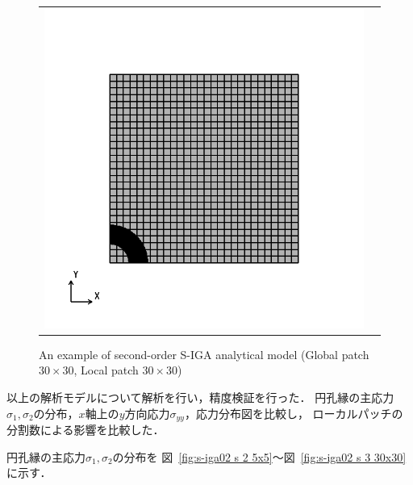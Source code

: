 \begin{figure}[hbtp]
\begin{tabular}{cc}
\begin{minipage}[t]{0.45\hsize}
      \includegraphics[keepaspectratio, scale=0.3]
      {fig/result_data_etc/s-iga02/model/30x30.png}
      \caption{An example of second-order S-IGA analytical model (Global patch $30\times 30$, Local patch $30\times 30$)}
      \label{fig:s-iga02 model04}
    \end{minipage}
  \end{tabular}
\end{figure}

\noindent
以上の解析モデルについて解析を行い，精度検証を行った．
円孔縁の主応力$\sigma_1, \sigma_2$の分布，$x$軸上の$y$方向応力$\sigma_{yy}$，応力分布図を比較し，
ローカルパッチの分割数による影響を比較した．

円孔縁の主応力$\sigma_1, \sigma_2$の分布を
図~\ref{fig:s-iga02 s 2 5x5}～図~\ref{fig:s-iga02 s 3 30x30}に示す．


